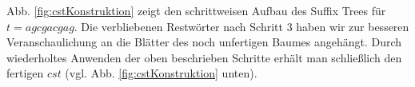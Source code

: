 \documentclass[12pt]{report}
\begin{document}
Abb. \ref{fig:cstKonstruktion} zeigt den schrittweisen Aufbau des Suffix Trees für $t = agcgacgag$. Die verbliebenen Restwörter nach Schritt 3 haben wir zur besseren Veranschaulichung an die Blätter des noch unfertigen Baumes angehängt. Durch wiederholtes Anwenden der oben beschrieben Schritte erhält man schließlich den fertigen $cst$ (vgl. Abb. \ref{fig:cstKonstruktion} unten).

\end{document}
